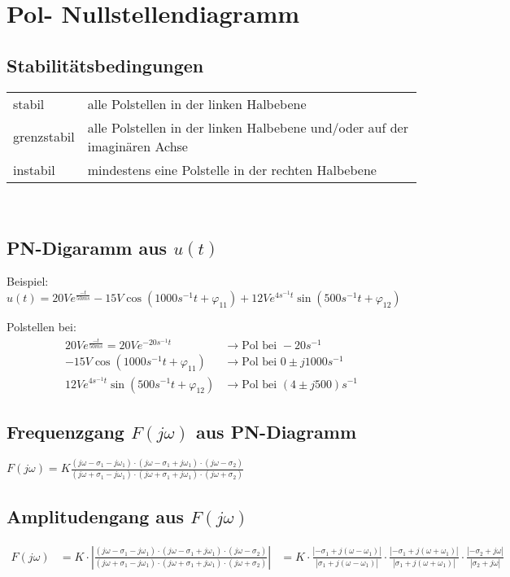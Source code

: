 \section{Pol- Nullstellendiagramm}
\subsection{Stabilitätsbedingungen}
\begin{tabular}{ll}
	stabil & alle Polstellen in der linken Halbebene\\
	grenzstabil & alle Polstellen in der linken Halbebene und/oder auf der
	imaginären Achse\\
	instabil & mindestens eine Polstelle in der rechten Halbebene
\end{tabular}\\

\subsection{PN-Digaramm aus $u(t)$}



Beispiel: \newline
$u(t)=20Ve^{\frac{-t}{50ms}}-15V\cos(1000s^{-1}t+\varphi_{11})+12Ve^{4s^{-1}t}\sin(500s^{-1}t+\varphi_{12})$

Polstellen bei: \\
\begin{align}
	20Ve^{\frac{-t}{50ms}} = 20Ve^{-20s^{-1}t} &\rightarrow \text{Pol bei }
	-20s^{-1}\nonumber\\
	-15V\cos(1000s^{-1}t+\varphi_{11}) &\rightarrow \text{Pol bei }
	0\pm j1000s^{-1}\nonumber\\
	12Ve^{4s^{-1}t}\sin(500s^{-1}t+\varphi_{12}) &\rightarrow \text{Pol bei } (4\pm
	j500)s^{-1}\nonumber
\end{align}


\subsection{Frequenzgang $F(j\omega)$ aus PN-Diagramm}

$F(j\omega)=K\frac{(j\omega-\sigma_1-j\omega_1)\cdot(j\omega-\sigma_1+j\omega_1)\cdot(j\omega-\sigma_2)}{(j\omega+\sigma_1-j\omega_1)\cdot(j\omega+\sigma_1+j\omega_1)\cdot(j\omega+\sigma_2)}$

\subsection{Amplitudengang aus $F\left(j\omega\right)$}
\begin{align}
F(j\omega)&=K\cdot\left|\frac{(j\omega-\sigma_1-j\omega_1)\cdot(j\omega-\sigma_1+j\omega_1)\cdot(j\omega-\sigma_2)}{(j\omega+\sigma_1-j\omega_1)\cdot(j\omega+\sigma_1+j\omega_1)\cdot(j\omega+\sigma_2)}\right| 
&= K \cdot \frac{\left|-\sigma_1+j\left(\omega-\omega_1\right)\right|}{\left|\sigma_1+j\left(\omega-\omega_1\right)\right|} \cdot \frac{\left|-\sigma_1+j\left(\omega+\omega_1\right)\right|}{\left|\sigma_1+j\left(\omega+\omega_1\right)\right|} \cdot \frac{\left|-\sigma_2+j\omega\right|}{\left|\sigma_2+j\omega\right|} \nonumber
\end{align}

